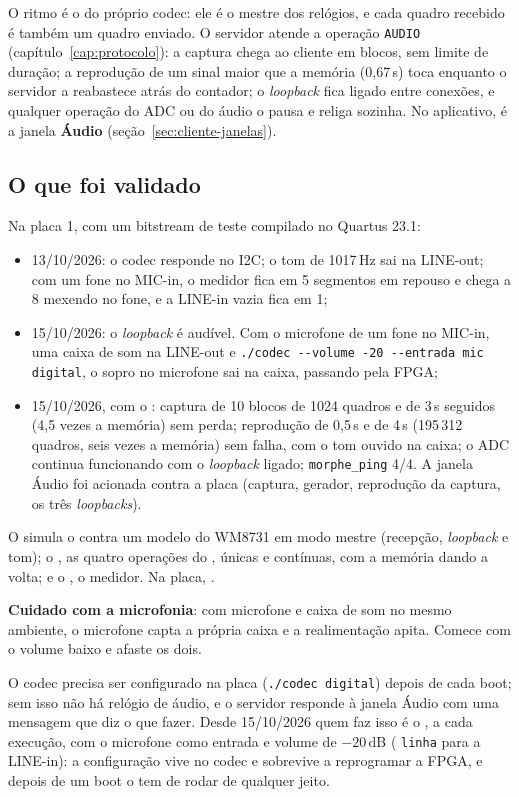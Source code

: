 O ritmo é o do próprio codec: ele é o mestre dos relógios, e cada quadro
recebido é também um quadro enviado. O servidor atende a operação
\texttt{AUDIO} (capítulo~\ref{cap:protocolo}): a captura chega ao cliente em
blocos, sem limite de duração; a reprodução de um sinal maior que a memória
(0,67\,s) toca enquanto o servidor a reabastece atrás do contador; o
\emph{loopback} fica ligado entre conexões, e qualquer operação do ADC ou do
áudio o pausa e religa sozinha. No aplicativo, é a janela \textbf{Áudio}
(seção~\ref{sec:cliente-janelas}).

\subsection{O que foi validado}
\label{sec:codec-validado}

Na placa 1, com um bitstream de teste compilado no Quartus 23.1:

\begin{itemize}
  \item 13/10/2026: o codec responde no I2C; o tom de 1017\,Hz sai na
    LINE-out; com um fone no MIC-in, o medidor fica em 5 segmentos em
    repouso e chega a 8 mexendo no fone, e a LINE-in vazia fica em 1;
  \item 15/10/2026: o \emph{loopback} é audível. Com o microfone de um fone
    no MIC-in, uma caixa de som na LINE-out e
    \texttt{./codec -{}-volume -20 -{}-entrada mic digital}, o sopro no microfone
    sai na caixa, passando pela FPGA;
  \item 15/10/2026, com o : captura de 10 blocos de 1024
    quadros e de 3\,s seguidos (4,5 vezes a memória) sem perda; reprodução de
    0,5\,s e de 4\,s (195\,312 quadros, seis vezes a memória) sem falha, com o
    tom ouvido na caixa; o ADC continua funcionando com o \emph{loopback}
    ligado; \texttt{morphe\_ping} 4/4. A janela Áudio foi acionada contra a
    placa (captura, gerador, reprodução da captura, os três \emph{loopbacks}).
\end{itemize}

O  simula o  contra um
modelo do WM8731 em modo mestre (recepção, \emph{loopback} e tom); o
, as quatro operações do , únicas e
contínuas, com a memória dando a volta; e o , o medidor.
Na placa, .

\textbf{Cuidado com a microfonia}: com microfone e caixa de som no mesmo
ambiente, o microfone capta a própria caixa e a realimentação apita. Comece com
o volume baixo e afaste os dois.

O codec precisa ser configurado na placa (\texttt{./codec digital}) depois de
cada boot; sem isso não há relógio de áudio, e o servidor responde à janela
Áudio com uma mensagem que diz o que fazer. Desde 15/10/2026 quem faz isso é o
, a cada execução, com o microfone como entrada e volume de
\(-20\)\,dB ( \texttt{linha} para a LINE-in): a configuração vive no codec e sobrevive a reprogramar a FPGA, e
depois de um boot o  tem de rodar de qualquer jeito.
